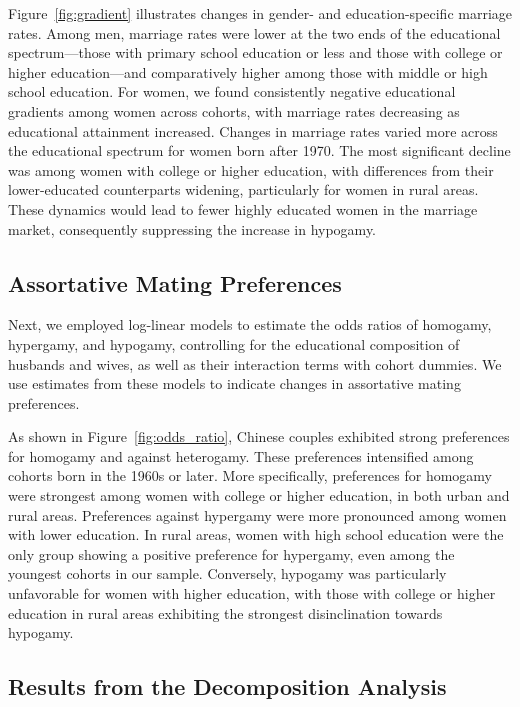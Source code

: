 Figure~\ref{fig:gradient} illustrates changes in gender- and education-specific marriage rates. Among men, marriage rates were lower at the two ends of the educational spectrum—those with primary school education or less and those with college or higher education—and comparatively higher among those with middle or high school education. For women, we found consistently negative educational gradients among women across cohorts, with marriage rates decreasing as educational attainment increased. Changes in marriage rates varied more across the educational spectrum for women born after 1970. The most significant decline was among women with college or higher education, with differences from their lower-educated counterparts widening, particularly for women in rural areas. These dynamics would lead to fewer highly educated women in the marriage market, consequently suppressing the increase in hypogamy.

\subsection{Assortative Mating Preferences}

Next, we employed log-linear models to estimate the odds ratios of homogamy, hypergamy, and hypogamy, controlling for the educational composition of husbands and wives, as well as their interaction terms with cohort dummies. We use estimates from these models to indicate changes in assortative mating preferences.

As shown in Figure~\ref{fig:odds_ratio}, Chinese couples exhibited strong preferences for homogamy and against heterogamy. These preferences intensified among cohorts born in the 1960s or later. More specifically, preferences for homogamy were strongest among women with college or higher education, in both urban and rural areas. Preferences against hypergamy were more pronounced among women with lower education. In rural areas, women with high school education were the only group showing a positive preference for hypergamy, even among the youngest cohorts in our sample. Conversely, hypogamy was particularly unfavorable for women with higher education, with those with college or higher education in rural areas exhibiting the strongest disinclination towards hypogamy.

\subsection{Results from the Decomposition Analysis}

